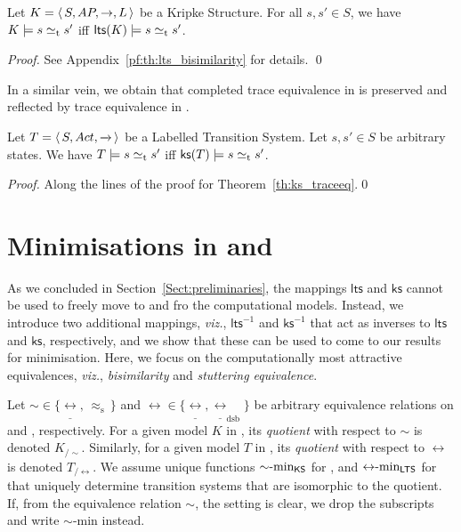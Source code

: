 \documentclass{llncs}
\newcommand{\ltstrans}[1]{\xrightarrow{#1}}
\newcommand{\kstrans}{\to}
\newcommand{\bisim}{\mbox{$\underline{\leftrightarrow}$}}
\newcommand{\dsbbisim}{\mbox{$\underline{\leftrightarrow}_{\mathrm{dsb}}$}}
\newcommand{\stuttering}{\,\approx_{\mathrm{s}}\,}
\newcommand{\lts}{\mathsf{lts}}
\newcommand{\ltsrev}{\lts^{-1}}
\newcommand{\ks}{\mathsf{ks}}
\newcommand{\ksrev}{\ks^{-1}}
\newcommand{\viz}{\emph{viz.}}
\begin{document}
\begin{theorem}
\label{th:ks_traceeq}
Let $K = \tuple{S, \AP, \kstrans, L}$ be a Kripke Structure. For all
$s,s' \in S$, we have $K \models s \simeq_{\mathrm{t}} s'$ iff
$\lts(K) \models s \traceeq s'$.
\end{theorem}

\begin{proof}
See Appendix~\ref{pf:th:lts_bisimilarity} for details.
\qed
\end{proof}
In a similar vein, we obtain that completed trace equivalence in
\LTS is preserved and reflected by trace equivalence in \KS.
\begin{theorem}
\label{th:lts_traceeq}
Let $T = \tuple{S, \act, \ltstrans{}}$ be a Labelled Transition System.
Let $s, s' \in S$ be arbitrary states. We have $T \models s \simeq_{\mathrm{t}} s'$ iff
$\ks(T) \models s \traceeq s'$.

\end{theorem}
\begin{proof}
Along the lines of the proof for Theorem~\ref{th:ks_traceeq}.\qed
\end{proof}


\section{Minimisations in \LTS and \KS}
\label{sec:minimisations}

As we concluded in Section~\ref{Sect:preliminaries}, the mappings $\lts$
and $\ks$ cannot be used to freely move to and fro the computational
models.  Instead, we introduce two additional mappings, \viz, $\ltsrev$
and $\ksrev$ that act as inverses to $\lts$ and $\ks$, respectively, and
we show that these can be used to come to our results for minimisation.
Here, we focus on the computationally most attractive
equivalences, \viz, \emph{bisimilarity} and \emph{stuttering equivalence}.

\renewcommand{\min}[1]{{#1}\textrm{-min}}
\newcommand{\minKS}[1]{{#1}\textrm{-min}_{\KS}}
\newcommand{\minLTS}[1]{{#1}\textrm{-min}_{\LTS}}
\newcommand{\quotient}[2]{\ensuremath{{#1}_{/#2}}}
Let $\sim {} \in \{\bisim, \stuttering\}$ and $\leftrightarrow {} \in \{ \bisim, \dsbbisim \}$ be arbitrary equivalence
relations on \KS and \LTS, respectively.  For a given model $K$ in \KS, its \emph{quotient}
with respect to $\sim$ is denoted $\quotient{K}{\sim}$. Similarly, for a given model $T$ in \LTS, its \emph{quotient}
with respect to $\leftrightarrow$ is denoted $\quotient{T}{\leftrightarrow}$. We assume
unique functions $\minKS{\sim}$ for \KS, and $\minLTS{\leftrightarrow}$
for \LTS that uniquely determine transition systems that are isomorphic
to the quotient. If, from the equivalence relation $\sim$, the setting
is clear, we drop the subscripts and write $\min{\sim}$ instead.
\end{document}

